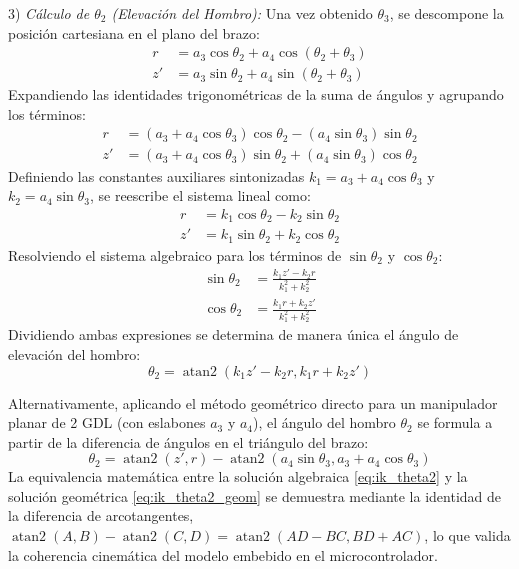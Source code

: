 \documentclass[conference,a4paper]{IEEEtran}
\begin{document}
3) \textit{Cálculo de $\theta_2$ (Elevación del Hombro):}
Una vez obtenido $\theta_3$, se descompone la posición cartesiana en el plano del brazo:
\begin{align}
r &= a_3 \cos\theta_2 + a_4 \cos(\theta_2 + \theta_3) \\
z' &= a_3 \sin\theta_2 + a_4 \sin(\theta_2 + \theta_3)
\end{align}
Expandiendo las identidades trigonométricas de la suma de ángulos y agrupando los términos:
\begin{align}
r &= (a_3 + a_4 \cos\theta_3) \cos\theta_2 - (a_4 \sin\theta_3) \sin\theta_2 \\
z' &= (a_3 + a_4 \cos\theta_3) \sin\theta_2 + (a_4 \sin\theta_3) \cos\theta_2
\end{align}
Definiendo las constantes auxiliares sintonizadas $k_1 = a_3 + a_4 \cos\theta_3$ y $k_2 = a_4 \sin\theta_3$, se reescribe el sistema lineal como:
\begin{align}
r &= k_1 \cos\theta_2 - k_2 \sin\theta_2 \\
z' &= k_1 \sin\theta_2 + k_2 \cos\theta_2
\end{align}
Resolviendo el sistema algebraico para los términos de $\sin\theta_2$ y $\cos\theta_2$:
\begin{align}
\sin\theta_2 &= \frac{k_1 z' - k_2 r}{k_1^2 + k_2^2} \\
\cos\theta_2 &= \frac{k_1 r + k_2 z'}{k_1^2 + k_2^2}
\end{align}
Dividiendo ambas expresiones se determina de manera única el ángulo de elevación del hombro:
\begin{equation}
\theta_2 = \operatorname{atan2}\left( k_1 z' - k_2 r, k_1 r + k_2 z' \right)
\label{eq:ik_theta2}
\end{equation}

Alternativamente, aplicando el método geométrico directo para un manipulador planar de 2 GDL (con eslabones $a_3$ y $a_4$), el ángulo del hombro $\theta_2$ se formula a partir de la diferencia de ángulos en el triángulo del brazo:
\begin{equation}
\theta_2 = \operatorname{atan2}(z', r) - \operatorname{atan2}(a_4 \sin\theta_3, a_3 + a_4 \cos\theta_3)
\label{eq:ik_theta2_geom}
\end{equation}
La equivalencia matemática entre la solución algebraica \eqref{eq:ik_theta2} y la solución geométrica \eqref{eq:ik_theta2_geom} se demuestra mediante la identidad de la diferencia de arcotangentes, $\operatorname{atan2}(A, B) - \operatorname{atan2}(C, D) = \operatorname{atan2}(A D - B C, B D + A C)$, lo que valida la coherencia cinemática del modelo embebido en el microcontrolador.
\end{document}
